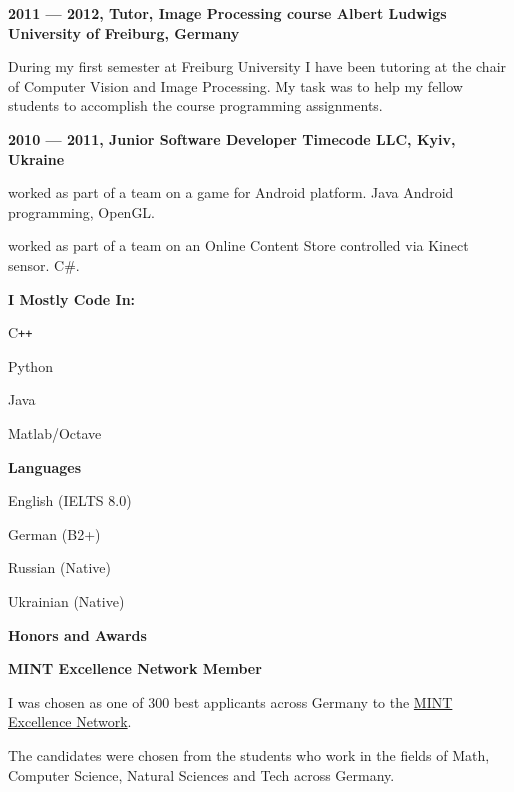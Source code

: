 \documentclass[a4paper,12pt,final]{memoir}
\newcommand{\Sep}{\vspace{1.5em}}
\newcommand{\SmallSep}{\vspace{0.5em}}
\newcommand{\CVSection}[1]
	{\Large\textbf{#1}\par
	\SmallSep\normalsize\normalfont}
\newcommand{\CVItem}[1]
	{\textbf{\color{MidnightBlue} #1}}
\begin{document}
\CVItem{2011 --- 2012, Tutor, Image Processing course
\newline Albert Ludwigs University of Freiburg, Germany}
\begin{compactitem}[\color{RoyalBlue}$\circ$]
\item During my first semester at Freiburg University I have been tutoring at
the chair of Computer Vision and Image Processing. My task was to help my fellow
students to accomplish the course programming assignments.
\end{compactitem}
\SmallSep

\CVItem{2010 --- 2011, Junior Software Developer
\newline Timecode LLC, Kyiv, Ukraine}
\begin{compactitem}[\color{MidnightBlue}$\circ$]
\item worked as part of a team on a game for Android platform. Java Android
programming, OpenGL.\@
\item worked as part of a team on an Online Content Store controlled via Kinect
sensor. C\#.
\end{compactitem}
\SmallSep
\framebreak
\clearpage
\framebreak{}
	\SmallSep{}
	\vspace{-2mm}

	\CVSection{I Mostly Code In:}
	\begin{compactitem}[\color{MidnightBlue}$\circ$]
		\item C\texttt{++}
		\item Python
		\item Java
		\item Matlab/Octave
	\end{compactitem}
	\Sep{}

	\CVSection{Languages}
	\begin{compactitem}[\color{MidnightBlue}$\circ$]
		\item English (IELTS 8.0)
		\item German (B2+)
		\item Russian (Native)
		\item Ukrainian (Native)
	\end{compactitem}
	\Sep{}

	\CVSection{Honors and Awards}
	\CVItem{MINT Excellence Network Member}
	\begin{compactitem}[\color{MidnightBlue}$\circ$]
		\item I was chosen as one of 300 best applicants across Germany to the
		\href{http://www.mlp.de/#/studenten/karriere/stipendienprogramme/mint-excellence}
		{MINT Excellence Network}.

		The candidates were chosen from the students who work in the fields of Math,
		Computer Science, Natural Sciences and Tech across Germany.
	\end{compactitem}
	\SmallSep{}
\end{document}
